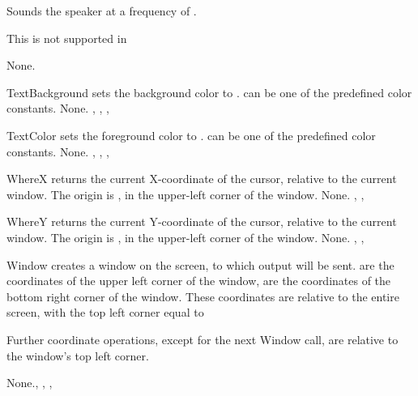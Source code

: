 


{ Sounds the speaker at a frequency of .

This is not supported in \linux}{None.}{}

{
TextBackground sets the background color to .  can be one of the
predefined color constants.
}
{None.}{ , , ,
}



{
TextColor sets the foreground color to .  can be one of the
predefined color constants.
}
{None.}{ , , ,
}



{
WhereX returns the current X-coordinate of the cursor, relative to the
current window. The origin is , in the upper-left corner of the
window.
}
{None.}{ , ,  }




{
WhereY returns the current Y-coordinate of the cursor, relative to the
current window. The origin is , in the upper-left corner of the
window.
}
{None.}{ , ,  }



{ Window creates a window on the screen, to which output will be sent.
 are the coordinates of the upper left corner of the window,
 are the coordinates of the bottom right corner of the window.
These coordinates are relative to the entire screen, with the top left
corner equal to 

Further coordinate operations, except for the next Window call,
are relative to the window's top left corner.
}
{None.}{, , , }





